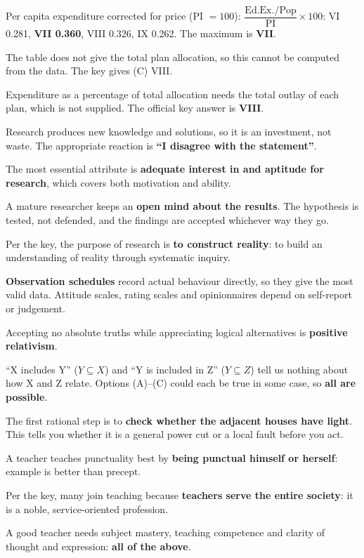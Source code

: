 Per capita expenditure corrected for price (PI $=100$): $\dfrac{\text{Ed.Ex.}/\text{Pop}}{\text{PI}}\times100$: VI 0.281, \textbf{VII 0.360}, VIII 0.326, IX 0.262. The maximum is \textbf{VII}.

The table does not give the total plan allocation, so this cannot be computed from the data. The key gives (C) VIII.

Expenditure as a percentage of total allocation needs the total outlay of each plan, which is not supplied. The official key answer is \textbf{VIII}.

Research produces new knowledge and solutions, so it is an investment, not waste. The appropriate reaction is \textbf{``I disagree with the statement''}.

The most essential attribute is \textbf{adequate interest in and aptitude for research}, which covers both motivation and ability.

A mature researcher keeps an \textbf{open mind about the results}. The hypothesis is tested, not defended, and the findings are accepted whichever way they go.

Per the key, the purpose of research is \textbf{to construct reality}: to build an understanding of reality through systematic inquiry.

\textbf{Observation schedules} record actual behaviour directly, so they give the most valid data. Attitude scales, rating scales and opinionnaires depend on self-report or judgement.

Accepting no absolute truths while appreciating logical alternatives is \textbf{positive relativism}.

``X includes Y'' ($Y\subseteq X$) and ``Y is included in Z'' ($Y\subseteq Z$) tell us nothing about how X and Z relate. Options (A)--(C) could each be true in some case, so \textbf{all are possible}.

The first rational step is to \textbf{check whether the adjacent houses have light}. This tells you whether it is a general power cut or a local fault before you act.

A teacher teaches punctuality best by \textbf{being punctual himself or herself}: example is better than precept.

Per the key, many join teaching because \textbf{teachers serve the entire society}: it is a noble, service-oriented profession.

A good teacher needs subject mastery, teaching competence and clarity of thought and expression: \textbf{all of the above}.

